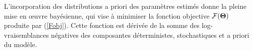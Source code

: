 \documentclass[11pt]{book}
\newcommand{\Fobj}{\mathcal{F}}%
\def\bfTh{{\bf \Theta}}%
\def\bfTh{{\bf \Theta}}          %
\newcommand{\eref}[1]{(\ref{#1})}
\begin{document}
L'incorporation des distributions a priori des param\`{e}tres estim\'{e}s donne la pleine mise en {\oe}uvre bay\'{e}sienne, qui vise \`{a} minimiser la fonction objective $\Fobj(\bfTh)$ produite par \eref{Fobj}. 
Cette fonction est d\'{e}riv\'{e}e de la somme des log-vraisemblances n\'{e}gatives des composantes d\'{e}terministes, stochastiques et a priori du mod\`{e}le. %

\bigskip


\setlength\tabcolsep{0pt}

\end{document}

